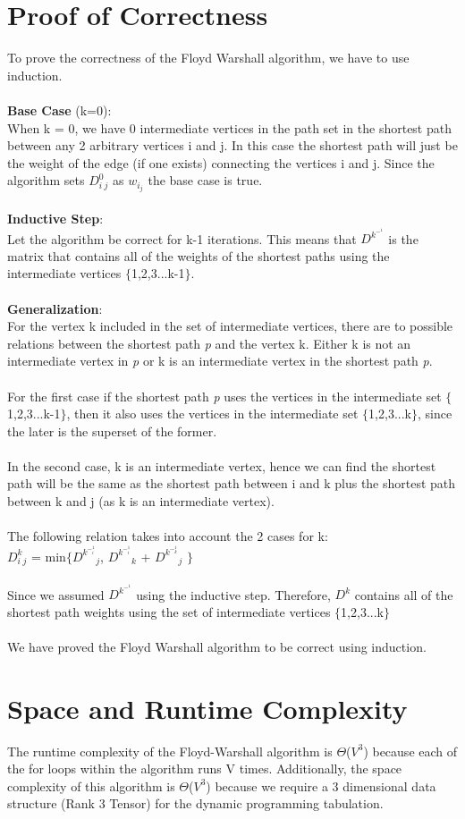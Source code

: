 \documentclass[12pt, letterpaper]{article}
\begin{document}
\section{Proof of Correctness}
To prove the correctness of the Floyd Warshall algorithm, we have to use induction.\\\\
\textbf{Base Case} (k=0):\\
When k = 0, we have 0 intermediate vertices in the path set in the shortest path between any 2 arbitrary vertices i and j. In this case the shortest path will just be the weight of the edge (if one exists) connecting the vertices i and j. Since the algorithm sets $D^0_i_j$ as $w_i_j$ the base case is true.\\\\
\textbf{Inductive Step}:\\
Let the algorithm be correct for k-1 iterations. This means that $D^k^-^1$ is the matrix that contains all of the weights of the shortest paths using the intermediate vertices $\{$1,2,3...k-1$\}$.\\\\
\textbf{Generalization}:\\
For the vertex k included in the set of intermediate vertices, there are to possible relations between the shortest path \textit{p} and the vertex k. Either k is not an intermediate vertex in \textit{p} or k is an intermediate vertex in the shortest path \textit{p}.\\\\
For the first case if the shortest path \textit{p} uses the vertices in the intermediate set $\{$1,2,3...k-1$\}$, then it also uses the vertices in the intermediate set $\{$1,2,3...k$\}$, since the later is the superset of the former.\\\\
In the second case, k is an intermediate vertex, hence we can find the shortest path will be the same as the shortest path between i and k plus the shortest path between k and j (as k is an intermediate vertex).\\\\
The following relation takes into account the 2 cases for k:\\
$D^k_i_j$ = min$\{$$D^k^-^1_i_j$, $D^k^-^1_i_k$ + $D^k^-^1_k_j$  $\}$\\\\
Since we assumed $D^k^-^1$ using the inductive step. Therefore, $D^k$ contains all of the shortest path weights using the set of intermediate vertices $\{$1,2,3...k$\}$\\\\
We have proved the Floyd Warshall algorithm to be correct using induction.


\section{Space and Runtime Complexity}
The runtime complexity of the Floyd-Warshall algorithm is $\Theta$($V^3$) because each of the for loops within the algorithm runs V times. Additionally, the space complexity of this algorithm is $\Theta$($V^3$) because we require a 3 dimensional data structure (Rank 3 Tensor) for the dynamic programming tabulation. 
\end{document}
